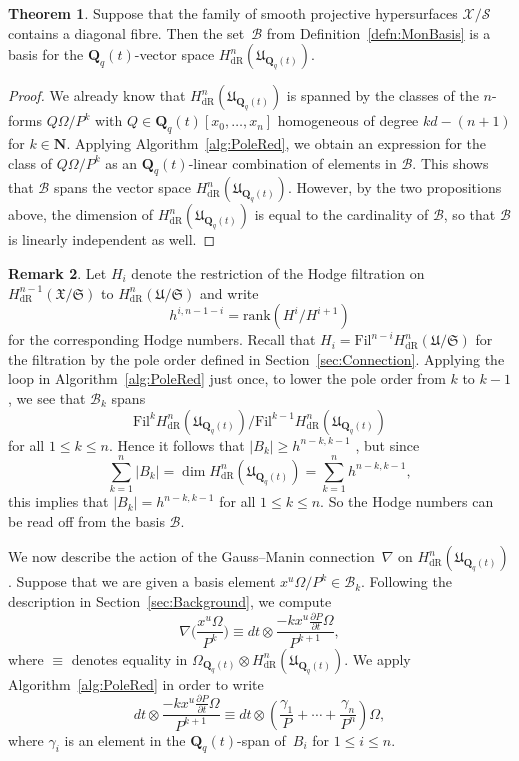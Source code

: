 \documentclass[a4paper,11pt]{article}
\numberwithin{equation}{section}
\providecommand{\card}[1]{\lvert#1\rvert}                %
\newcommand{\NN}{\mathbf{N}} %
\newcommand{\QQ}{\mathbf{Q}} %
\providecommand{\HdR}{H_{\text{dR}}}    %
\providecommand{\cB}{\mathcal{B}} %
\theoremstyle{definition}
\newtheorem{thm}{Theorem}[section]
\newtheorem{rem}[thm]{Remark}
\begin{document}
\begin{thm} \label{thm:Basis}
Suppose that the family of smooth projective hypersurfaces $\mathcal{X}/\mathcal{S}$ 
contains a diagonal fibre.  Then the set~$\cB$ from Definition~\ref{defn:MonBasis} 
is a basis for the $\QQ_q(t)$-vector space $\HdR^n(\mathfrak{U}_{\QQ_q(t)})$.
\end{thm}

\begin{proof}
We already know that $\HdR^n(\mathfrak{U}_{\QQ_q(t)})$ is spanned by the classes of the 
$n$-forms $Q \Omega / P^k$ with $Q \in \QQ_q(t)[x_0, \dotsc, x_n]$ homogeneous of degree 
$kd - (n+1)$ for $k \in \NN$. Applying Algorithm~\ref{alg:PoleRed}, we obtain an 
expression for the class of $Q \Omega / P^k$ as an $\QQ_q(t)$-linear combination of 
elements in $\cB$.  This shows that $\cB$ spans the vector space 
$\HdR^n(\mathfrak{U}_{\QQ_q(t)})$. However, by the two propositions above,
the dimension of $\HdR^n(\mathfrak{U}_{\QQ_q(t)})$ is equal to the cardinality of
$\cB$, so that $\cB$ is linearly independent as well.
\end{proof}

\begin{rem} \label{rem:hnumbers}
Let $H_i$ denote the restriction of the Hodge filtration on 
$\HdR^{n-1}(\mathfrak{X}/\mathfrak{S})$ to $\HdR^{n}(\mathfrak{U}/\mathfrak{S})$
and write 
\[
h^{i,n-1-i}=\mbox{rank}(H^i/H^{i+1})
\] 
for the corresponding Hodge numbers.
Recall that $H_i=\mbox{Fil}^{n-i} \HdR^{n}(\mathfrak{U}/\mathfrak{S})$
for the filtration by the pole order defined in Section~\ref{sec:Connection}. Applying 
the loop in Algorithm~\ref{alg:PoleRed} just once, to lower the pole 
order from $k$ to $k-1$, we see that $\cB_k$ spans 
\[
\mbox{Fil}^{k} \HdR^{n}(\mathfrak{U}_{\QQ_q(t)}) / \mbox{Fil}^{k-1} \HdR^{n}(\mathfrak{U}_{\QQ_q(t)})
\]
for all $1 \leq k \leq n$. Hence it follows that $\card{B_k} \geq h^{n-k,k-1}$ , but since
\[
\sum_{k=1}^n \card{B_k} = \dim \HdR^n(\mathfrak{U}_{\QQ_q(t)}) = \sum_{k=1}^n h^{n-k,k-1},
\] 
this implies that $\card{B_k} = h^{n-k,k-1}$ for all $1 \leq k \leq n$. So the Hodge numbers
can be read off from the basis $\cB$.
\end{rem}

We now describe the action of the Gauss--Manin connection~$\nabla$ on 
$\HdR^n(\mathfrak{U}_{\QQ_q(t)})$.  Suppose that we are given a basis element 
$x^u \Omega / P^k \in \cB_k$.  Following the description in 
Section~\ref{sec:Background}, we compute
\begin{equation} \label{eqn:nabla}
\nabla \biggl(\frac{x^u \Omega}{P^k}\biggr) \equiv 
dt \otimes \frac{- k x^u \frac{\partial P}{\partial t} \Omega}{P^{k+1}},
\end{equation}
where $\equiv$ denotes equality in 
$\Omega_{\QQ_q(t)} \otimes \HdR^n(\mathfrak{U}_{\QQ_q(t)})$. We apply 
Algorithm~\ref{alg:PoleRed} in order to write
\begin{equation}
dt \otimes \frac{- k x^u \frac{\partial P}{ \partial t} \Omega}{P^{k+1}} \equiv 
dt \otimes \left( \frac{\gamma_{1}}{P} + \dotsb + \frac{\gamma_n}{P^n} \right) \Omega,
\end{equation}
where $\gamma_i$ is an element in the $\QQ_q(t)$-span of~$B_i$ for $1 \leq i \leq n$. 
\end{document}
